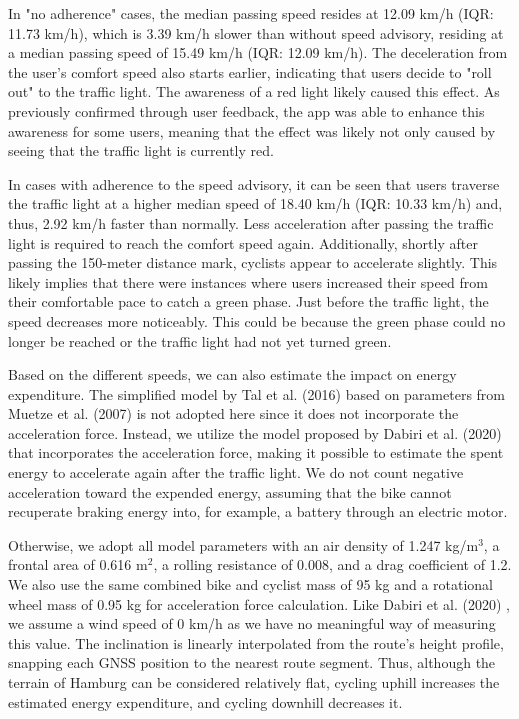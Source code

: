 In "no adherence" cases, the median passing speed resides at 12.09 km/h (IQR: 11.73 km/h), which is 3.39 km/h slower than without speed advisory, residing at a median passing speed of 15.49 km/h (IQR: 12.09 km/h). The deceleration from the user's comfort speed also starts earlier, indicating that users decide to "roll out" to the traffic light. The awareness of a red light likely caused this effect. As previously confirmed through user feedback, the app was able to enhance this awareness for some users, meaning that the effect was likely not only caused by seeing that the traffic light is currently red.

In cases with adherence to the speed advisory, it can be seen that users traverse the traffic light at a higher median speed of 18.40 km/h (IQR: 10.33 km/h) and, thus, 2.92 km/h faster than normally. Less acceleration after passing the traffic light is required to reach the comfort speed again. Additionally, shortly after passing the 150-meter distance mark, cyclists appear to accelerate slightly. This likely implies that there were instances where users increased their speed from their comfortable pace to catch a green phase. Just before the traffic light, the speed decreases more noticeably. This could be because the green phase could no longer be reached or the traffic light had not yet turned green.

Based on the different speeds, we can also estimate the impact on energy expenditure. The simplified model by Tal et al. (2016) \cite{tal_vehicular-communications-based_2016} based on parameters from Muetze et al. (2007) \cite{muetze_electric_2007} is not adopted here since it does not incorporate the acceleration force. Instead, we utilize the model proposed by Dabiri et al. (2020) \cite{dabiri_optimized_2020} that incorporates the acceleration force, making it possible to estimate the spent energy to accelerate again after the traffic light. We do not count negative acceleration toward the expended energy, assuming that the bike cannot recuperate braking energy into, for example, a battery through an electric motor.

Otherwise, we adopt all model parameters with an air density of 1.247 kg/m$^3$, a frontal area of 0.616 m$^2$, a rolling resistance of 0.008, and a drag coefficient of 1.2. We also use the same combined bike and cyclist mass of 95 kg and a rotational wheel mass of 0.95 kg for acceleration force calculation. Like Dabiri et al. (2020) \cite{dabiri_optimized_2020}, we assume a wind speed of 0 km/h as we have no meaningful way of measuring this value. The inclination is linearly interpolated from the route's height profile, snapping each GNSS position to the nearest route segment. Thus, although the terrain of Hamburg can be considered relatively flat, cycling uphill increases the estimated energy expenditure, and cycling downhill decreases it.

